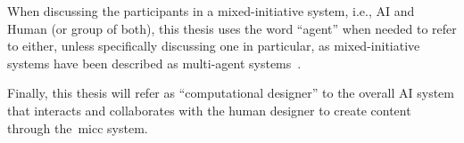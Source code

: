 
When discussing the participants in a mixed-initiative system, i.e., AI and Human (or group of both), this thesis uses the word ``agent'' when needed to refer to either, unless specifically discussing one in particular, as mixed-initiative systems have been described as multi-agent systems~\cite{Allen99-MIinteraction}.

Finally, this thesis will refer as ``computational designer'' to the overall AI system that interacts and collaborates with the human designer to create content through the~\acrshort{micc} system. 




